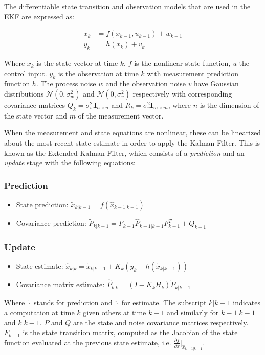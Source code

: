 \documentclass[letterpaper, 10 pt, conference]{ieeeconf}  %
\begin{document}
The differentiable state transition and observation models that are used in the EKF are expressed as: 

\begin{align}
 x_k &= f(x_{k-1}, u_{k-1}) + w_{k-1} \\
 y_k &= h(x_k) + v_k
\end{align}

Where $x_k$ is the state vector at time $k$, $f$ is the nonlinear state function, $u$ the control input. $y_k$ is the observation at time $k$ with measurement prediction function $h$. The process noise $w$ and the observation noise $v$ have Gaussian distributions $\mathcal{N}(0,\sigma_w^2)$ and $\mathcal{N}(0,\sigma_v^2)$ respectively with corresponding covariance matrices $Q_k = \sigma_w^2 \mathbf{I}_{n\times n}$ and $R_k = \sigma_v^2 \mathbf{I}_{m\times m}$, where $n$ is the dimension of the state vector and $m$ of the measurement vector.

When the measurement and state equations are nonlinear, these can be linearized about the most recent state estimate in order to apply the Kalman Filter. This is known as the Extended Kalman Filter, which consists of a \emph{prediction} and an \emph{update} stage with the following equations:

\subsubsection{Prediction} 
\begin{itemize}
\item State prediction: $\tilde{x}_{k|k-1} = f(\hat{x}_{k-1|k-1})$
\item Covariance prediction: $\tilde{P}_{k|k-1} = F_{k-1}\hat{P}_{k-1|k-1}F^T_{k-1} + Q_{k-1}$ 
\end{itemize}

\subsubsection{Update}
\begin{itemize}
 \item State estimate: $\hat{x}_{k|k} = \tilde{x}_{k|k-1} + K_k (y_k - h(\tilde{x}_{k|k-1}))$
 \item Covariance matrix estimate: $\hat{P}_{k|k} = (I - K_k H_k) \tilde{P}_{k|k-1}$
\end{itemize}

Where $\tilde{\cdot}$ stands for prediction and $\hat{\cdot}$ for estimate. The subscript $k|k-1$ indicates a computation at time $k$ given others at time $k-1$ and similarly for $k-1|k-1$ and $k|k-1$. $P$ and $Q$ are the state and noise covariance matrices respectively. $F_{k-1}$ is the state transition matrix, computed as the Jacobian of the state function evaluated at the previous state estimate, i.e. $\frac{\partial f}{\partial x} \rvert_{\hat{x}_{k-1|k-1}}$.
\end{document}
